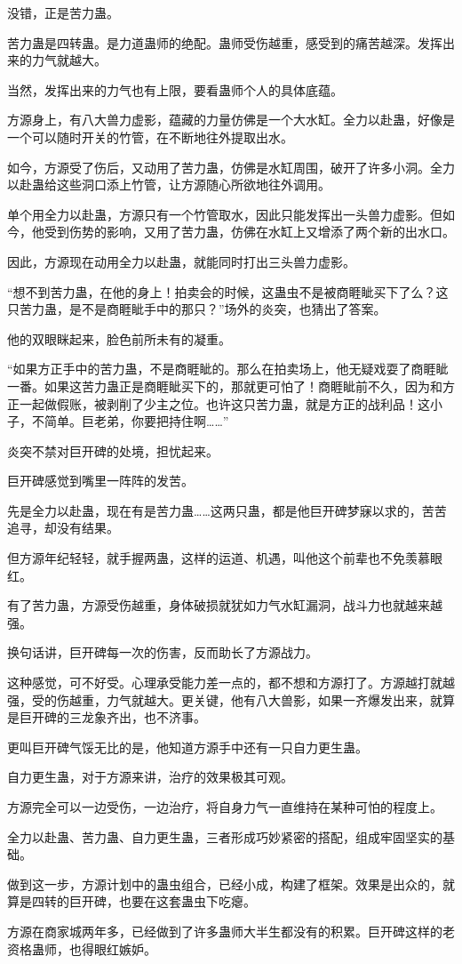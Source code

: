 \begin{this_body}
没错，正是苦力蛊。

苦力蛊是四转蛊。是力道蛊师的绝配。蛊师受伤越重，感受到的痛苦越深。发挥出来的力气就越大。

当然，发挥出来的力气也有上限，要看蛊师个人的具体底蕴。

方源身上，有八大兽力虚影，蕴藏的力量仿佛是一个大水缸。全力以赴蛊，好像是一个可以随时开关的竹管，在不断地往外提取出水。

如今，方源受了伤后，又动用了苦力蛊，仿佛是水缸周围，破开了许多小洞。全力以赴蛊给这些洞口添上竹管，让方源随心所欲地往外调用。

单个用全力以赴蛊，方源只有一个竹管取水，因此只能发挥出一头兽力虚影。但如今，他受到伤势的影响，又用了苦力蛊，仿佛在水缸上又增添了两个新的出水口。

因此，方源现在动用全力以赴蛊，就能同时打出三头兽力虚影。

“想不到苦力蛊，在他的身上！拍卖会的时候，这蛊虫不是被商睚眦买下了么？这只苦力蛊，是不是商睚眦手中的那只？”场外的炎突，也猜出了答案。

他的双眼眯起来，脸色前所未有的凝重。

“如果方正手中的苦力蛊，不是商睚眦的。那么在拍卖场上，他无疑戏耍了商睚眦一番。如果这苦力蛊正是商睚眦买下的，那就更可怕了！商睚眦前不久，因为和方正一起做假账，被剥削了少主之位。也许这只苦力蛊，就是方正的战利品！这小子，不简单。巨老弟，你要把持住啊……”

炎突不禁对巨开碑的处境，担忧起来。

巨开碑感觉到嘴里一阵阵的发苦。

先是全力以赴蛊，现在有是苦力蛊……这两只蛊，都是他巨开碑梦寐以求的，苦苦追寻，却没有结果。

但方源年纪轻轻，就手握两蛊，这样的运道、机遇，叫他这个前辈也不免羡慕眼红。

有了苦力蛊，方源受伤越重，身体破损就犹如力气水缸漏洞，战斗力也就越来越强。

换句话讲，巨开碑每一次的伤害，反而助长了方源战力。

这种感觉，可不好受。心理承受能力差一点的，都不想和方源打了。方源越打就越强，受的伤越重，力气就越大。更关键，他有八大兽影，如果一齐爆发出来，就算是巨开碑的三龙象齐出，也不济事。

更叫巨开碑气馁无比的是，他知道方源手中还有一只自力更生蛊。

自力更生蛊，对于方源来讲，治疗的效果极其可观。

方源完全可以一边受伤，一边治疗，将自身力气一直维持在某种可怕的程度上。

全力以赴蛊、苦力蛊、自力更生蛊，三者形成巧妙紧密的搭配，组成牢固坚实的基础。

做到这一步，方源计划中的蛊虫组合，已经小成，构建了框架。效果是出众的，就算是四转的巨开碑，也要在这套蛊虫下吃瘪。

方源在商家城两年多，已经做到了许多蛊师大半生都没有的积累。巨开碑这样的老资格蛊师，也得眼红嫉妒。

\end{this_body}

